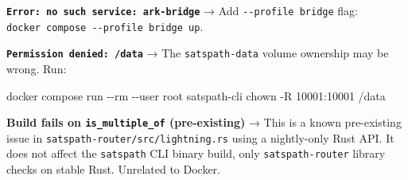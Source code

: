 \documentclass[
]{article}
\newenvironment{Shaded}{}{}
\newcommand{\AttributeTok}[1]{\textcolor[rgb]{0.49,0.56,0.16}{#1}}
\newcommand{\ExtensionTok}[1]{#1}
\newcommand{\NormalTok}[1]{#1}
\begin{document}
\textbf{\texttt{Error:\ no\ such\ service:\ ark-bridge}} → Add
\texttt{-\/-profile\ bridge} flag:
\texttt{docker\ compose\ -\/-profile\ bridge\ up}.

\textbf{\texttt{Permission\ denied:\ /data}} → The
\texttt{satspath-data} volume ownership may be wrong. Run:

\begin{Shaded}
\begin{Highlighting}[]
\ExtensionTok{docker}\NormalTok{ compose run }\AttributeTok{{-}{-}rm} \AttributeTok{{-}{-}user}\NormalTok{ root satspath{-}cli chown }\AttributeTok{{-}R}\NormalTok{ 10001:10001 /data}
\end{Highlighting}
\end{Shaded}

\textbf{Build fails on \texttt{is\_multiple\_of} (pre-existing)} → This
is a known pre-existing issue in
\texttt{satspath-router/src/lightning.rs} using a nightly-only Rust API.
It does not affect the \texttt{satspath} CLI binary build, only
\texttt{satspath-router} library checks on stable Rust. Unrelated to
Docker.
\end{document}
